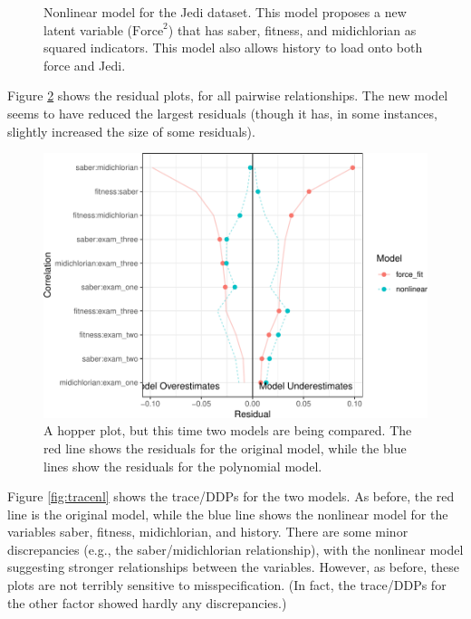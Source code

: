 \documentclass[
  english,
  doc]{apa6}
\begin{document}
\begin{figure}
\begin{center}
\caption{Nonlinear model for the Jedi dataset. This model proposes a new latent variable ($\text{Force}^2$) that has saber, fitness, and midichlorian as squared indicators. This model also allows history to load onto both force and Jedi.}
\label{fig:forceNonlin}
\end{center}
\end{figure}

Figure \ref{fig:hopperModcomp} shows the residual plots, for all pairwise relationships. The new model seems to have reduced the largest residuals (though it has, in some instances, slightly increased the size of some residuals).

\begin{figure}
\centering
\includegraphics{flexplavaan_draft_files/figure-latex/hopperModcomp-1.pdf}
\caption{\label{fig:hopperModcomp}A hopper plot, but this time two models are being compared. The red line shows the residuals for the original model, while the blue lines show the residuals for the polynomial model.}
\end{figure}

Figure \ref{fig:tracenl} shows the trace/DDPs for the two models. As before, the red line is the original model, while the blue line shows the nonlinear model for the variables saber, fitness, midichlorian, and history. There are some minor discrepancies (e.g., the saber/midichlorian relationship), with the nonlinear model suggesting stronger relationships between the variables. However, as before, these plots are not terribly sensitive to misspecification. (In fact, the trace/DDPs for the other factor showed hardly any discrepancies.)
\end{document}
